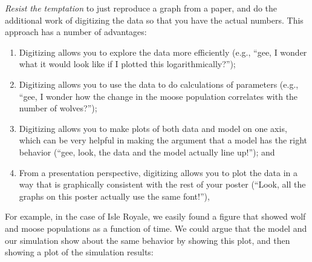 \documentclass{tufte-handout}
\begin{document}
{\it Resist the temptation} to just reproduce a graph from a paper, and do the additional work of digitizing the data so that you have the actual numbers.  This approach has a number of advantages:

\begin{enumerate}
\item Digitizing allows you to explore the data more efficiently (e.g., ``gee, I wonder what it would look like if I plotted this logarithmically?'');
\item Digitizing allows you to use the data to do calculations of parameters (e.g., ``gee, I wonder how the change in the moose population correlates with the number of wolves?'');
\item Digitizing allows you to make plots of both data and model on one axis, which can be very helpful in making the argument that a model has the right behavior (``gee, look, the data and the model actually line up!''); and
\item From a presentation perspective, digitizing allows you to plot the data in a way that is graphically consistent with the rest of your poster (``Look, all the graphs on this poster actually use the same font!''), 
\end{enumerate}

For example, in the case of Isle Royale, we easily found a figure that showed wolf and moose populations as a function of time.  We could argue that the model and our simulation show about the same behavior by showing this plot, and then showing a plot of the simulation results:
\end{document}
